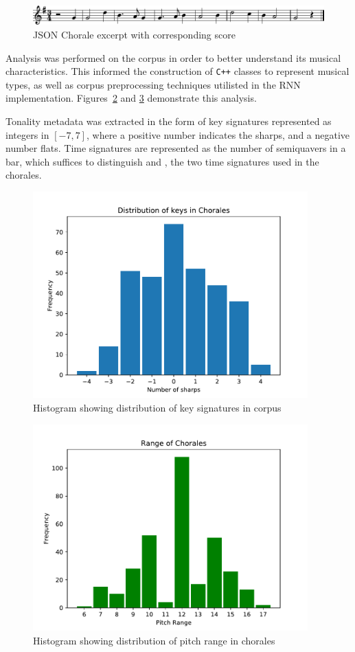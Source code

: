 \documentclass[12pt,a4paper,twoside,openright]{report}
\begin{document}
\begin{figure}[H]
\centering
\includegraphics[width=450pt]{figs/aus_meines_excerpt.pdf}
\caption{JSON Chorale excerpt with corresponding score}
\label{fig:chorale-excerpt}
\end{figure}

Analysis was performed on the corpus in order to better understand its musical
characteristics. This informed the construction of \texttt{C++} classes to
represent musical types, as well as corpus preprocessing techniques utilisted in
the RNN implementation. Figures~\ref{fig:key-dist} and \ref{fig:range-dist}
demonstrate this analysis.

Tonality metadata was extracted in the form of key signatures represented as
integers in $[-7,7]$, where a positive number indicates the sharps, and a
negative number flats. Time signatures are represented as the number of
semiquavers in a bar, which suffices to distinguish  and
, the two time signatures used in the chorales.

\begin{figure}[H]
\centering
\includegraphics[width=300pt]{figs/key_dist.pdf}
\caption{Histogram showing distribution of key signatures in corpus}
\label{fig:key-dist}
\end{figure}

\begin{figure}[H]
\centering
\includegraphics[width=300pt]{figs/range_dist.pdf}
\caption{Histogram showing distribution of pitch range in chorales}
\label{fig:range-dist}
\end{figure}
\end{document}
